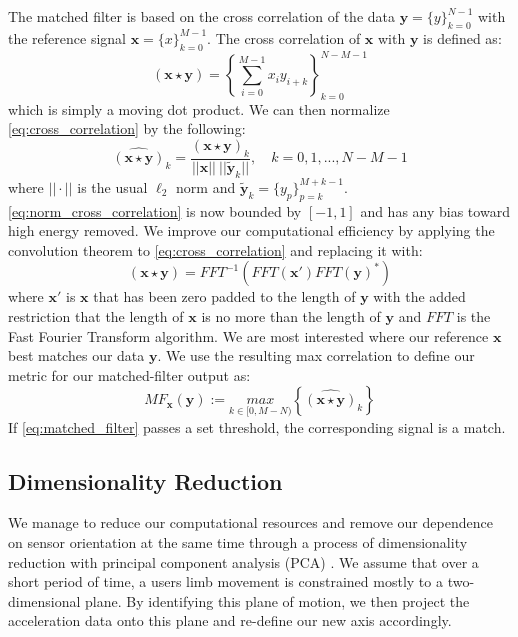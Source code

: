 \documentclass[journal]{IEEEtran}
\begin{document}
The matched filter is based on the cross correlation of the data $\textbf{y} = \{y\}_{k=0}^{N-1}$ with the reference signal $\textbf{x} = \{x\}_{k=0}^{M-1}$.
The cross correlation of $\textbf{x}$ with $\textbf{y}$ is defined as:
%
\begin{equation} \label{eq:cross_correlation}
(\textbf{x} \star \textbf{y}) = \left \{\sum_{i=0}^{M-1}x_{i} y_{i+k} \right \}_{k=0}^{N-M-1}
\end{equation}
%
which is simply a moving dot product.
We can then normalize \eqref{eq:cross_correlation} by the following:
%
\begin{equation} \label{eq:norm_cross_correlation}
\widehat{(\textbf{x} \star \textbf{y})}_k = \frac{(\textbf{x} \star \textbf{y})_k}{||\textbf{x}|| \ || \widetilde{\textbf{y}}_k || }, \quad k = 0,1,...,N-M-1
\end{equation}
%
where $|| \cdot ||$ is the usual $\ell_2$ norm and $\widetilde{\textbf{y}}_k = \{y_p\}_{p=k}^{M+k-1}$.
\eqref{eq:norm_cross_correlation} is now bounded by $[-1,1]$ and has any bias toward high energy removed.
We improve our computational efficiency by applying the convolution theorem to \eqref{eq:cross_correlation} and replacing it with:
%
\begin{equation} \label{eq:conv_theorem}
(\textbf{x} \star \textbf{y}) = FFT^{-1}(FFT(\textbf{x}') FFT(\textbf{y})^*)
\end{equation}
%
where $\textbf{x}'$ is $\textbf{x}$ that has been zero padded to the length of $\textbf{y}$ with the added restriction that the length of $\textbf{x}$ is no more than the length of $\textbf{y}$ and $FFT$ is the Fast Fourier Transform algorithm.
We are most interested where our reference $\textbf{x}$ best matches our data $\textbf{y}$.
We use the resulting max correlation to define our metric for  our matched-filter output as:
%
\begin{equation} \label{eq:matched_filter}
MF_{\textbf{x}}(\textbf{y}) := \underset{k \in [0, M-N)}{max} \left \{\widehat{(\textbf{x} \star \textbf{y})}_k \right \}
\end{equation}
%
If \eqref{eq:matched_filter} passes a set threshold, the corresponding signal is a match.
%
\subsection{Dimensionality Reduction}
We manage to reduce our computational resources and remove our dependence on sensor orientation at the same time through a process of dimensionality reduction with principal component analysis (PCA) \cite{bishop_2006}.
We assume that over a short period of time, a user\textquotesingle s limb movement is constrained mostly to a two-dimensional plane.
By identifying this plane of motion, we then project the acceleration data onto this plane and re-define our new axis accordingly.
\end{document}
